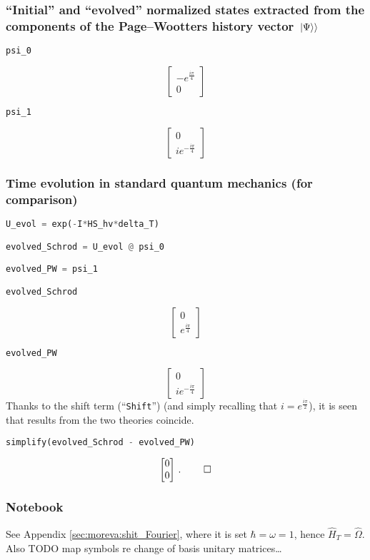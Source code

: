 \pagebreak\subsubsection*{``Initial'' and ``evolved'' normalized states extracted from the components of the Page--Wootters history vector $\left.\left| \Psi \right\rangle\right\rangle$}

\begin{lstlisting}[language=Python]
psi_0
\end{lstlisting}
$$
  \left[\begin{matrix}- e^{\frac{i \pi}{4}}\\0\end{matrix}\right]
$$
\begin{lstlisting}[language=Python]
psi_1
\end{lstlisting}
$$
  \left[\begin{matrix}0\\i e^{- \frac{i \pi}{4}}\end{matrix}\right]
$$

\subsubsection*{Time evolution in standard quantum mechanics (for comparison)}

\begin{lstlisting}[language=Python]
U_evol = exp(-I*HS_hv*delta_T)

evolved_Schrod = U_evol @ psi_0

evolved_PW = psi_1

evolved_Schrod
\end{lstlisting}
$$
  \left[\begin{matrix}0\\e^{\frac{i \pi}{4}}\end{matrix}\right]
$$
\begin{lstlisting}[language=Python]
evolved_PW
\end{lstlisting}
$$
  \left[\begin{matrix}0\\i e^{- \frac{i \pi}{4}}\end{matrix}\right]
$$
Thanks to the shift term (``\verb|Shift|'')
(and simply recalling that $i=e^{\frac{i\pi}{2}}$),
it is seen that
results from the two theories coincide.
\begin{lstlisting}[language=Python]
simplify(evolved_Schrod - evolved_PW)
\end{lstlisting}
$$
  \left[\begin{matrix}0\\0\end{matrix}\right] \, \text{.} \; \qed
$$

\subsubsection*{Notebook}

See Appendix \ref{sec:moreva:shit_Fourier}, where it is set $\hbar = \omega = 1$, hence $\hat{H}_T = \hat{\Omega}$.
Also TODO map symbols re change of basis unitary matrices\dots